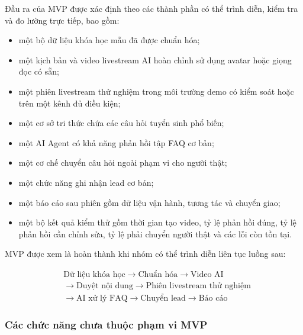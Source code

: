 Đầu ra của MVP được xác định theo các thành phần có thể trình diễn, kiểm tra và
đo lường trực tiếp, bao gồm:

\begin{itemize}
    \item một bộ dữ liệu khóa học mẫu đã được chuẩn hóa;

    \item một kịch bản và video livestream AI hoàn chỉnh sử dụng avatar hoặc
    giọng đọc có sẵn;

    \item một phiên livestream thử nghiệm trong môi trường demo có kiểm soát
    hoặc trên một kênh đủ điều kiện;

    \item một cơ sở tri thức chứa các câu hỏi tuyển sinh phổ biến;

    \item một AI Agent có khả năng phản hồi tập FAQ cơ bản;

    \item một cơ chế chuyển câu hỏi ngoài phạm vi cho người thật;

    \item một chức năng ghi nhận lead cơ bản;

    \item một báo cáo sau phiên gồm dữ liệu vận hành, tương tác và chuyển giao;

    \item một bộ kết quả kiểm thử gồm thời gian tạo video, tỷ lệ phản hồi đúng,
    tỷ lệ phản hồi cần chỉnh sửa, tỷ lệ phải chuyển người thật và các lỗi còn
    tồn tại.
\end{itemize}

MVP được xem là hoàn thành khi nhóm có thể trình diễn liên tục luồng sau:

\begin{align*}
&\text{Dữ liệu khóa học} \rightarrow \text{Chuẩn hóa} \rightarrow \text{Video AI} \\
&\rightarrow \text{Duyệt nội dung} \rightarrow \text{Phiên livestream thử nghiệm} \\
&\rightarrow \text{AI xử lý FAQ} \rightarrow \text{Chuyển lead} \rightarrow \text{Báo cáo}
\end{align*}

\subsubsection*{Các chức năng chưa thuộc phạm vi MVP}

